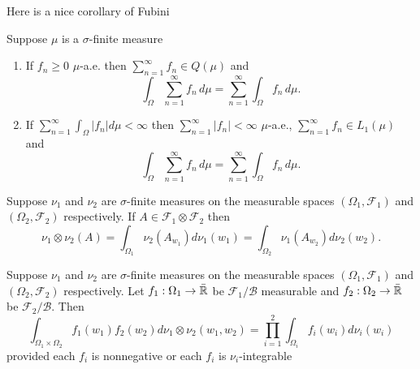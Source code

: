 Here is a nice corollary of Fubini

\begin{corollary}
\label{thm: Integration term by term}
Suppose $\mu$ is a $\sigma$-finite measure
\begin{enumerate}
\item If $f_n\geq 0$ $\mu$-a.e.  then  $\sum_{n=1}^\infty f_n\in Q(\mu)$ and
\[\int_\Omega \sum_{n=1}^\infty f_n  \, d\mu= \sum_{n=1}^\infty \int_\Omega  f_n  \, d\mu.\]
\item If $\sum_{n=1}^\infty \int_\Omega |f_n| d\mu<\infty$ then $\sum_{n=1}^\infty |f_n|<\infty$ $\mu$-a.e.,  $\sum_{n=1}^\infty f_n\in L_1(\mu)$ and
\[\int_\Omega \sum_{n=1}^\infty f_n  \, d\mu= \sum_{n=1}^\infty \int_\Omega  f_n  \, d\mu.\]
\end{enumerate}
\end{corollary}


\begin{corollary} Suppose $\nu_1$ and $\nu_2$ are $\sigma$-finite measures on the measurable spaces $(\Omega_1,\mathcal F_1)$ and  $( \Omega_2, \mathcal F_2)$ respectively. If $A\in \mathcal F_1\otimes \mathcal F_2$ then
\[\nu_1\otimes\nu_2(A) = \int_{\Omega_1} \nu_2(A_{w_1})d\nu_1(w_1)=  \int_{\Omega_2} \nu_1(A_{w_2})d\nu_2(w_2). \]
\end{corollary}





\begin{corollary} Suppose $\nu_1$ and $\nu_2$ are $\sigma$-finite measures on the measurable spaces $(\Omega_1,\mathcal F_1)$ and  $( \Omega_2, \mathcal F_2)$ respectively.
Let $f_1:\Omega_1\rightarrow \bar{\Bbb R}$ be $\mathcal F_1/\mathcal B$ measurable and $f_2:\Omega_2\rightarrow \bar{\Bbb R}$ be $\mathcal F_2/\mathcal B$. Then
\[ \int_{\Omega_1\times\Omega_2} \!\!\!\!f_1(w_1)f_2(w_2) d \nu_1\otimes\nu_2(w_1,w_2) = \prod_{i=1}^2 \int_{\Omega_i} f_i(w_i)d \nu_i(w_i)\]
provided each $f_i$ is nonnegative or each $f_i$ is $\nu_i$-integrable
\end{corollary}





